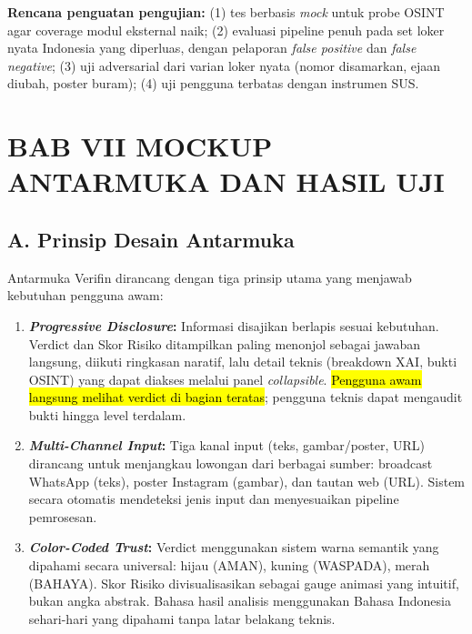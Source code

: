 \documentclass[12pt,a4paper]{article}
\newcommand{\revisi}[1]{\hl{#1}}
\newenvironment{sorotkuning}{%
  \begin{tcolorbox}[
    breakable,
    enhanced,
    frame hidden,
    boxrule=0pt,
    arc=0mm,
    sharp corners,
    colback=yellow!22,
    left=1.5mm, right=1.5mm, top=1.0mm, bottom=1.0mm,
    before skip=1.5pt, after skip=1.5pt
  ]%
}{%
  \end{tcolorbox}%
}
\begin{document}
\begin{sorotkuning}
\textbf{Rencana penguatan pengujian:} (1) tes berbasis \textit{mock} untuk probe OSINT agar coverage modul eksternal naik;
(2) evaluasi pipeline penuh pada set loker nyata Indonesia yang diperluas, dengan pelaporan \textit{false positive} dan
\textit{false negative}; (3) uji adversarial dari varian loker nyata (nomor disamarkan, ejaan diubah, poster buram);
(4) uji pengguna terbatas dengan instrumen SUS.
\end{sorotkuning}



\section*{BAB VII MOCKUP ANTARMUKA DAN HASIL UJI}

\subsection*{A. Prinsip Desain Antarmuka}

Antarmuka Verifin dirancang dengan tiga prinsip utama yang menjawab kebutuhan pengguna awam:

\begin{enumerate}[label=\textbf{\arabic*.}]
\item \textbf{\textit{Progressive Disclosure}:} Informasi disajikan berlapis sesuai kebutuhan.
Verdict dan Skor Risiko ditampilkan paling menonjol sebagai jawaban langsung, diikuti ringkasan
naratif, lalu detail teknis (breakdown XAI, bukti OSINT) yang dapat diakses melalui panel
\textit{collapsible}. \revisi{Pengguna awam langsung melihat verdict di bagian teratas}; pengguna teknis dapat
mengaudit bukti hingga level terdalam.

\item \textbf{\textit{Multi-Channel Input}:} Tiga kanal input (teks, gambar/poster, URL) dirancang
untuk menjangkau lowongan dari berbagai sumber: broadcast WhatsApp (teks), poster Instagram
(gambar), dan tautan web (URL). Sistem secara otomatis mendeteksi jenis input dan menyesuaikan
pipeline pemrosesan.

\item \textbf{\textit{Color-Coded Trust}:} Verdict menggunakan sistem warna semantik yang
dipahami secara universal: hijau (AMAN), kuning (WASPADA), merah (BAHAYA). Skor Risiko
divisualisasikan sebagai gauge animasi yang intuitif, bukan angka abstrak. Bahasa hasil analisis
menggunakan Bahasa Indonesia sehari-hari yang dipahami tanpa latar belakang teknis.
\end{enumerate}
\end{document}
